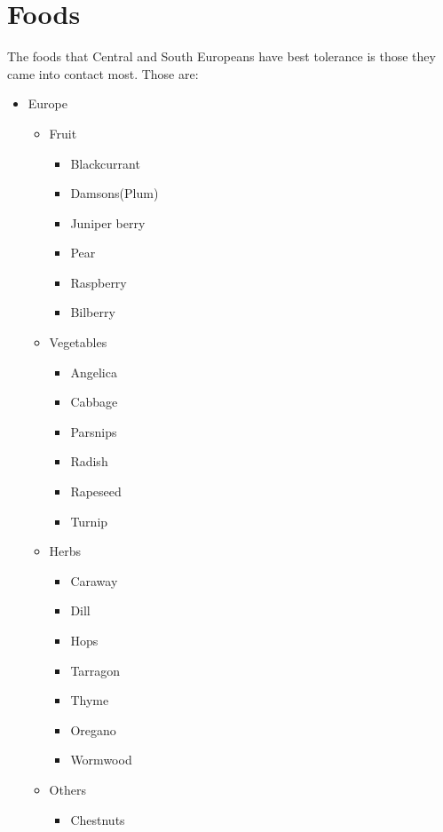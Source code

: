 \documentclass{article}
\begin{document}
	\section{Foods}
	The foods that Central and South Europeans have best tolerance is those they came into contact most. Those are:
	\begin{itemize}
		\item Europe
		\begin{itemize}
			\item Fruit
			\begin{itemize}
				\item Blackcurrant
				\item Damsons(Plum)
				\item Juniper berry
				\item Pear
				\item Raspberry
				\item Bilberry
			\end{itemize}
		\end{itemize}
		\begin{itemize}
			\item Vegetables
			\begin{itemize}
				\item Angelica
				\item Cabbage
				\item Parsnips
				\item Radish
				\item Rapeseed
				\item Turnip
			\end{itemize}
		\end{itemize}
		\begin{itemize}
			\item Herbs
			\begin{itemize}
				\item Caraway
				\item Dill
				\item Hops
				\item Tarragon
				\item Thyme
				\item Oregano
				\item Wormwood
			\end{itemize}
		\end{itemize}
		\begin{itemize}
			\item Others
			\begin{itemize}
				\item Chestnuts

\end{itemize}
\end{itemize}
\end{itemize}
\end{document}
